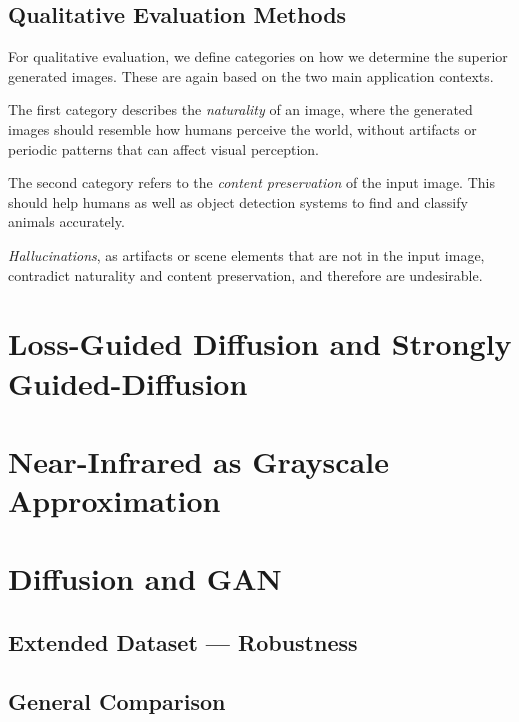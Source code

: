 \subsection{Qualitative Evaluation Methods}
For qualitative evaluation, we define categories on how we determine the superior generated images. These are again based on the two main application contexts.

The first category describes the \textit{naturality} of an image, where the generated images should resemble how humans perceive the world, without artifacts or periodic patterns that can affect visual perception.

The second category refers to the \textit{content preservation} of the input image. This should help humans as well as object detection systems to find and classify animals accurately.

\textit{Hallucinations}, as artifacts or scene elements that are not in the input image, contradict naturality and content preservation, and therefore are undesirable.

\section{Loss-Guided Diffusion and Strongly Guided-Diffusion}
\section{Near-Infrared as Grayscale Approximation}
\section{Diffusion and GAN}
\subsection{Extended Dataset --- Robustness}
\subsection{General Comparison}